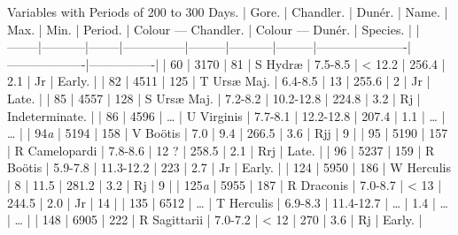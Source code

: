 \documentclass[a4paper, 12pt, oneside, polutonikogreek, english]{article}
\begin{document}
Variables with Periods of 200 to 300 Days. 
| Gore. | Chandler. | Dunér. | Name.     | Max.  | Min.   | Period. | Colour --- Chandler. | Colour --- Dunér. | Species.    |
|--------|-----------|--------|---------------|---------|-----------|---------|----------------------|-------------------|----------------|
| 60   | 3170   | 81   | S Hydræ    | 7.5-8.5 | < 12.2  | 256.4  | 2.1         | Jr        | Early.     |
| 82   | 4511   | 125  | T Ursæ Maj.  | 6.4-8.5 | 13    | 255.6  | 2          | Jr        | Late.     |
| 85   | 4557   | 128  | S Ursæ Maj.  | 7.2-8.2 | 10.2-12.8 | 224.8  | 3.2         | Rj        | Indeterminate. |
| 86   | 4596   | …   | U Virginis  | 7.7-8.1 | 12.2-12.8 | 207.4  | 1.1         | …         | …       |
| 94\emph{a} | 5194   | 158  | V Boötis   | 7.0   | 9.4    | 266.5  | 3.6         | Rjj        | 9       |
| 95   | 5190   | 157  | R Camelopardi | 7.8-8.6 | 12 ?   | 258.5  | 2.1         | Rrj        | Late.     |
| 96   | 5237   | 159  | R Boötis   | 5.9-7.8 | 11.3-12.2 | 223   | 2.7         | Jr        | Early.     |
| 124  | 5950   | 186  | W Herculis  | 8    | 11.5   | 281.2  | 3.2         | Rj        | 9       |
| 125\emph{a} | 5955   | 187  | R Draconis  | 7.0-8.7 | < 13   | 244.5  | 2.0         | Jr        | 14       |
| 135  | 6512   | …   | T Herculis  | 6.9-8.3 | 11.4-12.7 | …    | 1.4         | …         | …       |
| 148  | 6905   | 222  | R Sagittarii | 7.0-7.2 | < 12   | 270   | 3.6         | Rj        | Early.     |
\end{document}
